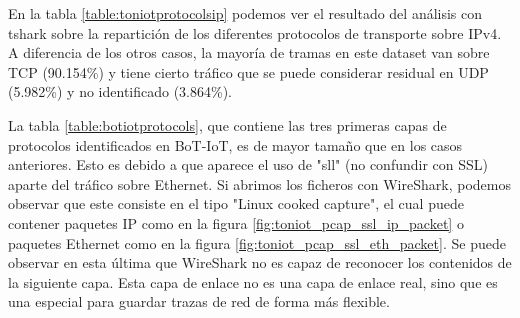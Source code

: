 En la tabla \ref{table:toniotprotocolsip} podemos ver el resultado del análisis con tshark sobre la repartición de los diferentes protocolos de transporte sobre IPv4. A diferencia de los otros casos, la mayoría de tramas en este dataset van sobre TCP (90.154\%) y tiene cierto tráfico que se puede considerar residual en UDP (5.982\%) y no identificado (3.864\%).



La tabla \ref{table:botiotprotocols}, que contiene las tres primeras capas de protocolos identificados en BoT-IoT, es de mayor tamaño que en los casos anteriores. Esto es debido a que aparece el uso de "sll" (no confundir con SSL) aparte del tráfico sobre Ethernet. Si abrimos los ficheros con WireShark, podemos observar que este consiste en el tipo "Linux cooked capture", el cual puede contener paquetes IP como en la figura \ref{fig:toniot_pcap_ssl_ip_packet} o paquetes Ethernet como en la figura \ref{fig:toniot_pcap_ssl_eth_packet}. Se puede observar en esta última que WireShark no es capaz de reconocer los contenidos de la siguiente capa. Esta capa de enlace no es una capa de enlace real, sino que es una especial para guardar trazas de red de forma más flexible. 

